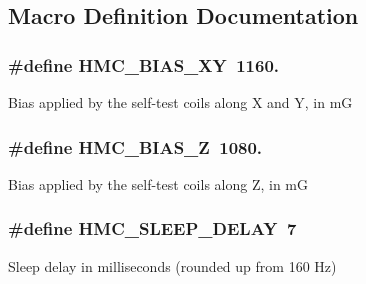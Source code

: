 \subsection{Macro Definition Documentation}
\hypertarget{group___general_constants_ga1c6efa9689c426e25ae1f2467430b876}{
\subsubsection[{H\+M\+C\+\_\+\+B\+I\+A\+S\+\_\+\+X\+Y}]{\setlength{\rightskip}{0pt plus 5cm}\#define H\+M\+C\+\_\+\+B\+I\+A\+S\+\_\+\+X\+Y~1160.}}\label{group___general_constants_ga1c6efa9689c426e25ae1f2467430b876}
Bias applied by the self-\/test coils along X and Y, in m\+G \hypertarget{group___general_constants_gacea61ca68e8efbad8a0f398051b84e29}{
\subsubsection[{H\+M\+C\+\_\+\+B\+I\+A\+S\+\_\+\+Z}]{\setlength{\rightskip}{0pt plus 5cm}\#define H\+M\+C\+\_\+\+B\+I\+A\+S\+\_\+\+Z~1080.}}\label{group___general_constants_gacea61ca68e8efbad8a0f398051b84e29}
Bias applied by the self-\/test coils along Z, in m\+G \hypertarget{group___general_constants_ga26afbcf737f1add055ea8929c03648a9}{
\subsubsection[{H\+M\+C\+\_\+\+S\+L\+E\+E\+P\+\_\+\+D\+E\+L\+A\+Y}]{\setlength{\rightskip}{0pt plus 5cm}\#define H\+M\+C\+\_\+\+S\+L\+E\+E\+P\+\_\+\+D\+E\+L\+A\+Y~7}}\label{group___general_constants_ga26afbcf737f1add055ea8929c03648a9}
Sleep delay in milliseconds (rounded up from 160 Hz) 